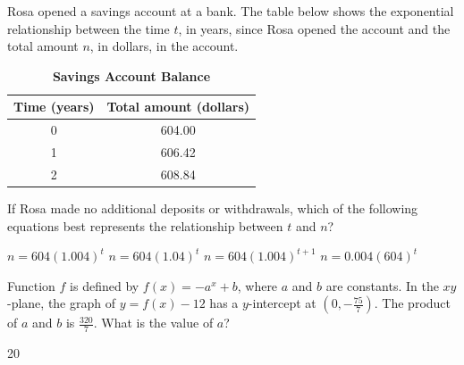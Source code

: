 \question[1]
Rosa opened a savings account at a bank. The table below shows the exponential relationship between the time $t$, in years, since Rosa opened the account and the total amount $n$, in dollars, in the account.
  \begin{table}[h!]
  \centering
  \renewcommand{\arraystretch}{1.3}
  \setlength{\tabcolsep}{8pt}
  \caption*{\textbf{Savings Account Balance}}
  \begin{tabular}{|c|c|}
  \hline
  \rowcolor[HTML]{E0E0E0}
  \textbf{Time (years)} & \textbf{Total amount (dollars)} \\
  \hline
  0 & 604.00 \\
  \hline
  1 & 606.42 \\
  \hline
  2 & 608.84 \\
  \hline
  \end{tabular}
  \end{table}
If Rosa made no additional deposits or withdrawals, which of the following equations best represents the relationship between $t$ and $n$?
\begin{choices}
  \CorrectChoice $n=604(1.004)^t$
  \choice $n=604(1.04)^t$
  \choice $n=604(1.004)^{t+1}$
  \choice $n=0.004(604)^t$
\end{choices}

\question[1]
Function $f$ is defined by $f(x)=-a^{x}+b$, where $a$ and $b$ are constants. In the $xy$-plane, the graph of $y=f(x)-12$ has a $y$-intercept at $\left(0,-\frac{75}{7}\right)$. The product of $a$ and $b$ is $\frac{320}{7}$. What is the value of $a$?
\begin{solution}
20
\end{solution}

\newpage


